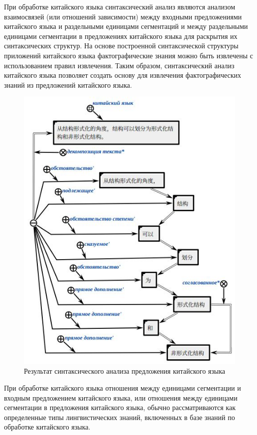 При обработке китайского языка синтаксический анализ являются анализом взаимосвязей (или отношений зависимости) между входными предложениями китайского языка и раздельными единицами сегментаций и между раздельными единицами сегментации в предложениях китайского языка для раскрытия их синтаксических структур. На основе построенной синтаксической структуры приложений китайского языка фактографические знания можно быть извлечены с использованием правил извлечения. Таким образом, синтаксический анализ китайского языка позволяет создать основу для извлечения фактографических знаний из предложений китайского языка.
\begin{figure}[H]
	\centering
	\includegraphics[scale=0.7]{images/part4/chapter_chinese/syntac_structure.png}
	\caption{Результат синтаксического анализа предложения китайского языка}
	\label{fig:syntac-structure}
\end{figure}

При обработке китайского языка отношения между единицами сегментации и входным предложением китайского языка, или отношения между единицами сегментации в предложения китайского языка, обычно рассматриваются как определенные типы лингвистических знаний, включенных в базе знаний по обработке китайского языка.

